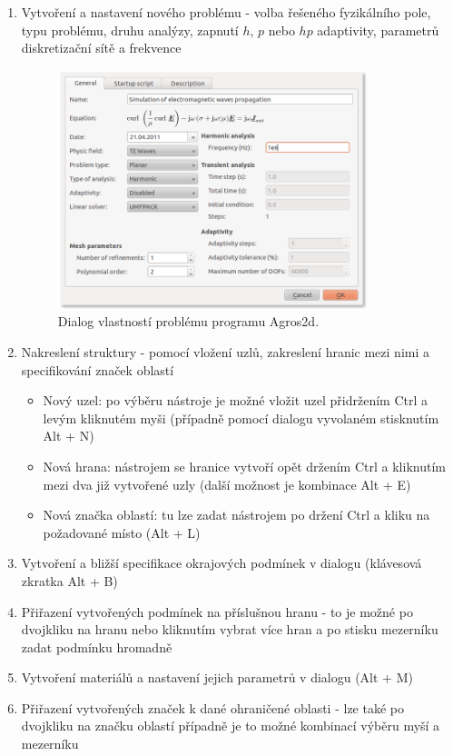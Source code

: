 \begin{enumerate}
\item Vytvoření a nastavení nového problému - volba řešeného fyzikálního pole, typu problému, druhu analýzy, zapnutí $h$, $p$ nebo $hp$ adaptivity, parametrů diskretizační sítě a frekvence
\begin{figure}[!h]
	\centering
	\includegraphics[width=9cm]{sim_problem_properties.png}
	\caption{Dialog vlastností problému programu Agros2d.}
	\label{obr:sim_problem_properties}
\end{figure}
\item Nakreslení struktury - pomocí vložení uzlů, zakreslení hranic mezi nimi a specifikování značek oblastí
\begin{itemize}
\item Nový uzel: po výběru nástroje  je možné vložit uzel přidržením Ctrl a levým kliknutém myši (případně pomocí dialogu vyvolaném stisknutím Alt + N)
\item Nová hrana: nástrojem  se hranice vytvoří opět držením Ctrl a kliknutím mezi dva již vytvořené uzly (další možnost je kombinace Alt + E)
\item Nová značka oblastí: tu lze zadat nástrojem  po držení Ctrl a kliku na požadované místo (Alt + L)
\end{itemize}
\item Vytvoření a bližší specifikace okrajových podmínek v dialogu  (klávesová zkratka Alt + B)
\item Přiřazení vytvořených podmínek na příslušnou hranu - to je možné po dvojkliku na hranu nebo kliknutím vybrat více hran a po stisku mezerníku zadat podmínku hromadně
\item Vytvoření materiálů a nastavení jejich parametrů v dialogu  (Alt + M)
\item Přiřazení vytvořených značek k dané ohraničené oblasti - lze také po dvojkliku na značku oblastí případně je to možné kombinací výběru myší a mezerníku

\end{enumerate}
